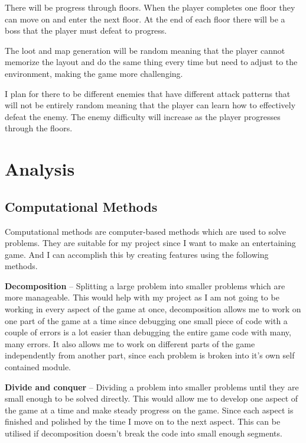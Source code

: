 \documentclass{article}
\newcommand{\parBr}{\vspace{5mm}}%
\begin{document}
\parBr

There will be progress through floors. When the player completes one floor they can move on and enter the next floor. At the end of each floor there will be a boss that the player must defeat to progress.

\parBr

The loot and map generation will be random meaning that the player cannot memorize the layout and do the same thing every time but need to adjust to the environment, making the game more challenging.

\parBr

I plan for there to be different enemies that have different attack patterns that will not be entirely random meaning that the player can learn how to effectively defeat the enemy. The enemy difficulty will increase as the player progresses through the floors.

\section{Analysis}
\subsection{Computational Methods}
Computational methods are computer-based methods which are used to solve problems. They are suitable for my project since I want to make an entertaining game. And I can accomplish this by creating features using the following methods.

\parBr

\textbf{Decomposition} – Splitting a large problem into smaller problems which are more manageable. This would help with my project as I am not going to be working in every aspect of the game at once, decomposition allows me to work on one part of the game at a time since debugging one small piece of code with a couple of errors is a lot easier than debugging the entire game code with many, many errors. It also allows me to work on different parts of the game independently from another part, since each problem is broken into it's own self contained module.

\parBr

\textbf{Divide and conquer} – Dividing a problem into smaller problems until they are small enough to be solved directly. This would allow me to develop one aspect of the game at a time and make steady progress on the game. Since each aspect is finished and polished by the time I move on to the next aspect. This can be utilised if decomposition doesn't break the code into small enough segments.
\end{document}
